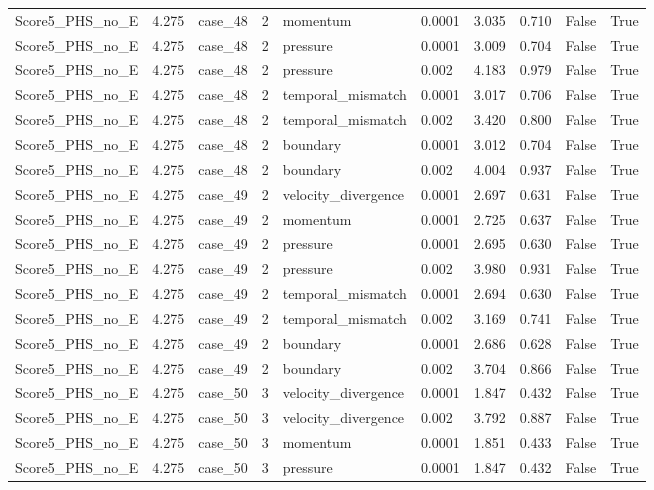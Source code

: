\begin{longtable}{llllllllll}
Score5\_PHS\_no\_E & 4.275 & case\_48 & 2 & momentum & 0.0001 & 3.035 & 0.710 & False & True \\
Score5\_PHS\_no\_E & 4.275 & case\_48 & 2 & pressure & 0.0001 & 3.009 & 0.704 & False & True \\
Score5\_PHS\_no\_E & 4.275 & case\_48 & 2 & pressure & 0.002 & 4.183 & 0.979 & False & True \\
Score5\_PHS\_no\_E & 4.275 & case\_48 & 2 & temporal\_mismatch & 0.0001 & 3.017 & 0.706 & False & True \\
Score5\_PHS\_no\_E & 4.275 & case\_48 & 2 & temporal\_mismatch & 0.002 & 3.420 & 0.800 & False & True \\
Score5\_PHS\_no\_E & 4.275 & case\_48 & 2 & boundary & 0.0001 & 3.012 & 0.704 & False & True \\
Score5\_PHS\_no\_E & 4.275 & case\_48 & 2 & boundary & 0.002 & 4.004 & 0.937 & False & True \\
Score5\_PHS\_no\_E & 4.275 & case\_49 & 2 & velocity\_divergence & 0.0001 & 2.697 & 0.631 & False & True \\
Score5\_PHS\_no\_E & 4.275 & case\_49 & 2 & momentum & 0.0001 & 2.725 & 0.637 & False & True \\
Score5\_PHS\_no\_E & 4.275 & case\_49 & 2 & pressure & 0.0001 & 2.695 & 0.630 & False & True \\
Score5\_PHS\_no\_E & 4.275 & case\_49 & 2 & pressure & 0.002 & 3.980 & 0.931 & False & True \\
Score5\_PHS\_no\_E & 4.275 & case\_49 & 2 & temporal\_mismatch & 0.0001 & 2.694 & 0.630 & False & True \\
Score5\_PHS\_no\_E & 4.275 & case\_49 & 2 & temporal\_mismatch & 0.002 & 3.169 & 0.741 & False & True \\
Score5\_PHS\_no\_E & 4.275 & case\_49 & 2 & boundary & 0.0001 & 2.686 & 0.628 & False & True \\
Score5\_PHS\_no\_E & 4.275 & case\_49 & 2 & boundary & 0.002 & 3.704 & 0.866 & False & True \\
Score5\_PHS\_no\_E & 4.275 & case\_50 & 3 & velocity\_divergence & 0.0001 & 1.847 & 0.432 & False & True \\
Score5\_PHS\_no\_E & 4.275 & case\_50 & 3 & velocity\_divergence & 0.002 & 3.792 & 0.887 & False & True \\
Score5\_PHS\_no\_E & 4.275 & case\_50 & 3 & momentum & 0.0001 & 1.851 & 0.433 & False & True \\
Score5\_PHS\_no\_E & 4.275 & case\_50 & 3 & pressure & 0.0001 & 1.847 & 0.432 & False & True \\

\end{longtable}
